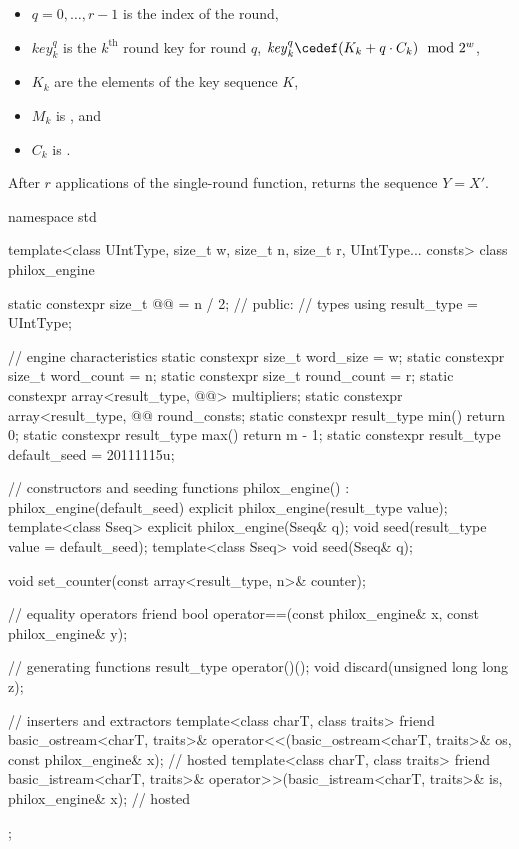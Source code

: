 \begin{itemize}
\begin{itemize}
  \item
  $q = 0, \dotsc, r - 1$ is the index of the round,

  \item
  $\mathit{key}^q_k$ is the $k^\text{th}$ round key for round $q$,
  $\mathit{key}^q_k \cedef (K_k + q \cdot C_k) \mod 2^w$,

  \item
  $K_k$ are the elements of the key sequence $K$,

  \item
  $M_k$ is , and

  \item
  $C_k$ is .
  \end{itemize}
\end{itemize}

\pnum
After $r$ applications of the single-round function,
 returns the sequence $Y = X'$.

%
%
\begin{codeblock}
namespace std {
  template<class UIntType, size_t w, size_t n, size_t r, UIntType... consts>
  class philox_engine {
    static constexpr size_t @@ = n / 2;   // \expos
  public:
    // types
    using result_type = UIntType;

    // engine characteristics
    static constexpr size_t word_size = w;
    static constexpr size_t word_count = n;
    static constexpr size_t round_count = r;
    static constexpr array<result_type, @@> multipliers;
    static constexpr array<result_type, @@ round_consts;
    static constexpr result_type min() { return 0; }
    static constexpr result_type max() { return m - 1; }
    static constexpr result_type default_seed = 20111115u;

    // constructors and seeding functions
    philox_engine() : philox_engine(default_seed) {}
    explicit philox_engine(result_type value);
    template<class Sseq> explicit philox_engine(Sseq& q);
    void seed(result_type value = default_seed);
    template<class Sseq> void seed(Sseq& q);

    void set_counter(const array<result_type, n>& counter);

    // equality operators
    friend bool operator==(const philox_engine& x, const philox_engine& y);

    // generating functions
    result_type operator()();
    void discard(unsigned long long z);

    // inserters and extractors
    template<class charT, class traits>
      friend basic_ostream<charT, traits>&
        operator<<(basic_ostream<charT, traits>& os, const philox_engine& x);   // hosted
    template<class charT, class traits>
      friend basic_istream<charT, traits>&
        operator>>(basic_istream<charT, traits>& is, philox_engine& x);         // hosted
  };
}
\end{codeblock}

